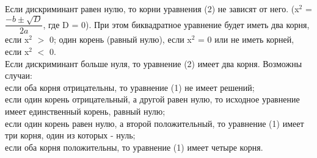 \documentclass[12pt,a4paper]{report}
\begin{document}
Если дискриминант равен нулю, то корни уравнения (2) не зависят от него. (x$^{2}$ = $\dfrac{-b \pm \sqrt{D}}{2a}$, где D = 0). При этом биквадратное уравнение будет иметь два корня, если x$^{2}$ $>$ 0; один корень (равный нулю), если x$^2$ = 0 или не иметь корней, если x$^{2}$ $<$ 0. \\ 
Если дискриминант больше нуля, то уравнение (2) имеет два корня. Возможны случаи: \\
если оба корня отрицательны, то уравнение (1) не имеет решений; \\
если один корень отрицательный, а другой равен нулю, то исходное уравнение имеет единственный корень, равный нулю; \\
если один корень равен нулю, а второй положительный, то уравнение (1) имеет три корня, один из которых - нуль; \\
если оба корня положительны, то уравнение (1) имеет четыре корня. 
\end{document}

